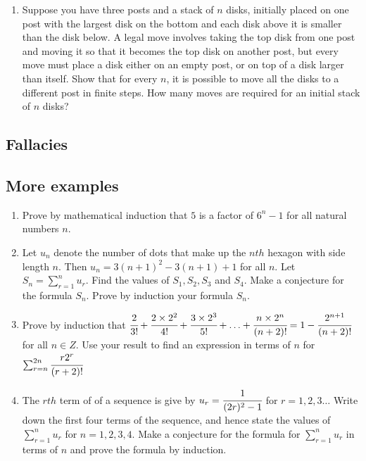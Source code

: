 \documentclass[letterpaper]{article}
\begin{document}
\begin{enumerate}
\item Suppose you have three posts and a stack of $n$ disks, initially placed on one post with the largest disk on the bottom and each disk above it is smaller than the disk below. A legal move involves taking the top disk from one post and moving it so that it becomes the top disk on another post, but every move must place a disk either on an empty post, or on top of a disk larger than itself. Show that for every $n$, it is possible to move all the disks to a different post in finite steps. How many moves are required for an initial stack of $n$ disks?
\end{enumerate}

\subsection{Fallacies}

\subsection{More examples}

\begin{enumerate}
\item Prove by mathematical induction that $5$ is a factor of $6^n - 1$ for all natural numbers $n$.

\item Let $u_n$ denote the number of dots that make up the $nth$ hexagon with side length $n$. Then $u_n = 3(n+1)^2 - 3(n+1) + 1$ for all $n$. Let $S_n = \sum_{r=1}^n u_r$. Find the values of $S_1, S_2, S_3$ and $S_4$. Make a conjecture for the formula $S_n$. Prove by induction your formula $S_n$.

\item Prove by induction that $\cfrac{2}{3!} + \cfrac{2 \times 2^2}{4!} + \cfrac{3 \times 2^3}{5!} + \ldots + \cfrac{n \times 2^n}{(n + 2)!} = 1 - \cfrac{2^{n+1}}{(n + 2)!}$ for all $n \in Z$. Use your result to find an expression in terms of $n$ for $\sum_{r=n}^{2n} \cfrac{r 2^r}{(r + 2)!}$

\item The $rth$ term of of a sequence is give by $u_r = \cfrac{1}{(2r)^2 - 1}$ for $r=1,2,3\ldots$ Write down the first four terms of the sequence, and hence state the values of $\sum_{r=1}^n u_r$ for $n=1,2,3,4$. Make a conjecture for the formula for $\sum_{r=1}^n u_r$ in terms of $n$ and prove the formula by induction.
\end{enumerate}
\end{document}
